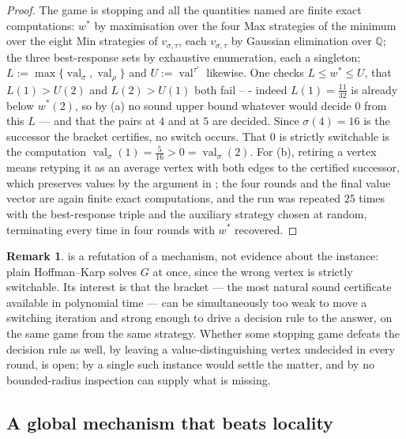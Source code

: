 \documentclass[11pt]{article}
\theoremstyle{plain}
\theoremstyle{definition}
\newtheorem{remark}[theorem]{Remark}
\DeclareMathOperator{\val}{val}
\begin{document}
\begin{proof}
The game is stopping and all the quantities named are finite exact
computations: $w^\ast$ by maximisation over the four Max strategies of
the minimum over the eight Min strategies of $v_{\sigma,\tau}$, each
$v_{\sigma,\tau}$ by Gaussian elimination over $\mathbb{Q}$; the three
best-response sets by exhaustive enumeration, each a singleton;
$L:=\max\{\val_\sigma,\val_\rho\}$ and $U:=\val^{\tau'}$ likewise. One
checks $L\le w^\ast\le U$, that $L(1)>U(2)$ and $L(2)>U(1)$ both fail --
- indeed $L(1)=\tfrac{11}{32}$ is already below $w^\ast(2)$, so by
(a) no sound upper bound whatever would decide $0$
from this $L$ --- and that the pairs at $4$ and at $5$ are decided.
Since $\sigma(4)=16$ is the successor the bracket certifies, no switch
occurs. That $0$ is strictly switchable is the computation
$\val_\sigma(1)=\tfrac{5}{16}>0=\val_\sigma(2)$. For (b), retiring a
vertex means retyping it as an average vertex with both edges to the
certified successor, which preserves values by the argument in
; the four rounds and the final value vector are
again finite exact computations, and the run was repeated $25$ times with
the best-response triple and the auxiliary strategy chosen at random,
terminating every time in four rounds with $w^\ast$ recovered.
\end{proof}

\begin{remark}
 is a refutation of a mechanism, not evidence
about the instance: plain Hoffman--Karp solves $G$ at once, since the
wrong vertex is strictly switchable. Its interest is that the bracket ---
the most natural sound certificate available in polynomial time --- can
be simultaneously too weak to move a switching iteration and strong
enough to drive a decision rule to the answer, on the same game from the
same strategy. Whether some stopping game defeats the decision rule as
well, by leaving a value-distinguishing vertex undecided in every round,
is open; by  a single such instance would settle
the matter, and by  no bounded-radius inspection can
supply what is missing.
\end{remark}

\subsection{A global mechanism that beats locality}\label{sec:simorder}
\end{document}
